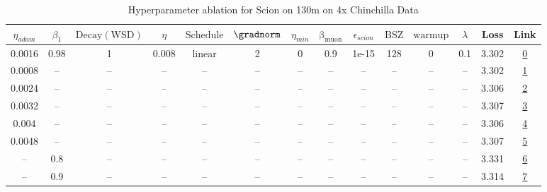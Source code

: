 \begin{table}[H]
\centering
\caption{Hyperparameter ablation for Scion on 130m on 4x Chinchilla Data}
\label{tab:ablation_scion_130m_on_4x_chinchilla_data}
\begin{tabular}{cccccccccccccc}
\toprule
$\eta_{adam}$ & $\beta_1$ & $\mathrm{Decay (WSD)}$ & $\eta$ & $\mathrm{Schedule}$ & $\gradnorm$ & $\eta_{min}$ & $\mathrm{\beta_{muon}}$ & $\epsilon_{scion}$ & $\mathrm{BSZ}$ & $\mathrm{warmup}$ & $\lambda$ & Loss & Link \\
\midrule
0.0016 & 0.98 & 1 & 0.008 & linear & 2 & 0 & 0.9 & 1e-15 & 128 & 0 & 0.1 & 3.302 & \href{https://wandb.ai/stanford-mercury/optimizer-scaling/runs/sweep-130m-10B-scion9698d1lr0.008-wd0.1-minlr0-warmup0-b10.98-gn-7282fc}{0} \\
\midrule
0.0008 & -- & -- & -- & -- & -- & -- & -- & -- & -- & -- & -- & 3.302 & \href{https://wandb.ai/stanford-mercury/optimizer-scaling/runs/sweep-130m-10B-scion9d476clr0.008-wd0.1-minlr0-warmup0-b10.98-gn-6116a3}{1} \\
0.0024 & -- & -- & -- & -- & -- & -- & -- & -- & -- & -- & -- & 3.306 & \href{https://wandb.ai/stanford-mercury/optimizer-scaling/runs/sweep-130m-10B-sciona8b5aalr0.008-wd0.1-minlr0-warmup0-b10.98-gn-e47df7}{2} \\
0.0032 & -- & -- & -- & -- & -- & -- & -- & -- & -- & -- & -- & 3.307 & \href{https://wandb.ai/stanford-mercury/optimizer-scaling/runs/sweep-130m-10B-scionb02b9dlr0.008-wd0.1-minlr0-warmup0-b10.98-gn-c39e4a}{3} \\
0.004 & -- & -- & -- & -- & -- & -- & -- & -- & -- & -- & -- & 3.306 & \href{https://wandb.ai/stanford-mercury/optimizer-scaling/runs/sweep-130m-10B-scion38a308lr0.008-wd0.1-minlr0-warmup0-b10.98-gn-1b6e87}{4} \\
0.0048 & -- & -- & -- & -- & -- & -- & -- & -- & -- & -- & -- & 3.307 & \href{https://wandb.ai/stanford-mercury/optimizer-scaling/runs/sweep-130m-10B-scion0eab92lr0.008-wd0.1-minlr0-warmup0-b10.98-gn-3e5a9b}{5} \\
-- & 0.8 & -- & -- & -- & -- & -- & -- & -- & -- & -- & -- & 3.331 & \href{https://wandb.ai/stanford-mercury/optimizer-scaling/runs/sweep-130m-10B-scion40e7b5lr0.008-wd0.1-minlr0-warmup0-b10.8-gn2-eda693}{6} \\
-- & 0.9 & -- & -- & -- & -- & -- & -- & -- & -- & -- & -- & 3.314 & \href{https://wandb.ai/stanford-mercury/optimizer-scaling/runs/sweep-130m-10B-scion51153elr0.008-wd0.1-minlr0-warmup0-b10.9-gn2-da2cf1}{7} \\

\end{tabular}
\end{table}
